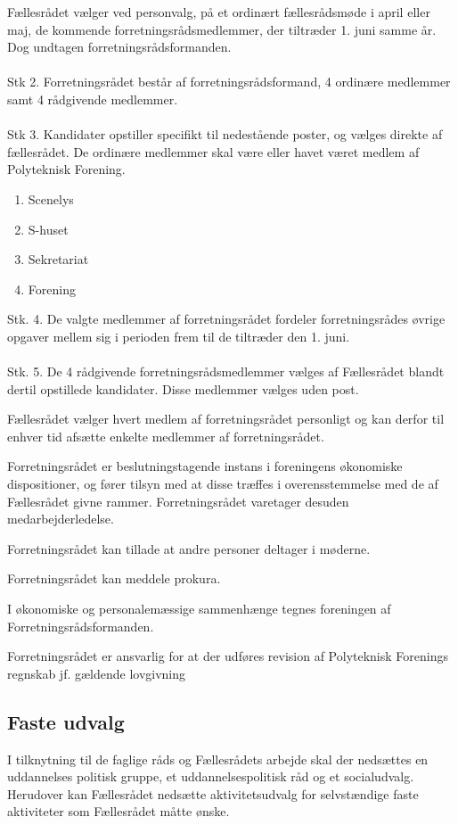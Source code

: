 \begin{list}
\item Fællesrådet vælger ved personvalg, på et ordinært fællesrådsmøde i april eller maj, de kommende forretningsrådsmedlemmer, der tiltræder 1. juni samme år. Dog undtagen forretningsrådsformanden.
\\
\\
Stk 2. Forretningsrådet består af forretningsrådsformand, 4 ordinære medlemmer samt 4 rådgivende medlemmer.
\\
\\
Stk 3. Kandidater opstiller specifikt til nedestående poster, og vælges direkte af fællesrådet. De ordinære medlemmer skal være eller havet været medlem af Polyteknisk Forening.
\begin{enumerate}
\item Scenelys
\item S-huset
\item Sekretariat
\item Forening
\end{enumerate}
Stk. 4. De valgte medlemmer af forretningsrådet fordeler forretningsrådes øvrige opgaver mellem sig i perioden frem til de tiltræder den 1. juni.
\\
\\
Stk. 5. De 4 rådgivende forretningsrådsmedlemmer vælges af Fællesrådet blandt dertil opstillede kandidater. Disse medlemmer vælges uden post.

\item Fællesrådet vælger hvert medlem af forretningsrådet personligt og kan derfor til enhver tid afsætte enkelte medlemmer af forretningsrådet.
\item Forretningsrådet er beslutningstagende instans i foreningens økonomiske dispositioner, og fører tilsyn med at disse træffes i overensstemmelse med de af Fællesrådet givne rammer. Forretningsrådet varetager desuden medarbejderledelse.
\item Forretningsrådet kan tillade at andre personer deltager i møderne.
\item Forretningsrådet kan meddele prokura.
\item I økonomiske og personalemæssige sammenhænge tegnes foreningen af Forretningsrådsformanden.
\item Forretningsrådet er ansvarlig for at der udføres revision af Polyteknisk Forenings regnskab jf. gældende lovgivning	

\subsection{Faste udvalg}
\label{kapL:fasteUdvalg}
\item I tilknytning til de faglige råds og Fællesrådets arbejde skal der nedsættes en uddannelses politisk gruppe, et uddannelsespolitisk råd og et socialudvalg. Herudover kan Fællesrådet nedsætte aktivitetsudvalg for selvstændige faste aktiviteter som Fællesrådet måtte ønske.


\end{list}
